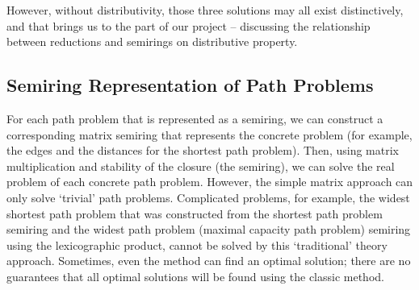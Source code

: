 \documentclass[a4paper,12pt,twoside,openright]{report}
\begin{document}
However, without distributivity, those three solutions may all exist distinctively,  and that brings us to the part of our project – discussing the relationship between reductions and semirings on distributive property.

\subsection{Semiring Representation of Path Problems}
For each path problem that is represented as a semiring, we can construct a corresponding matrix semiring that represents the concrete problem (for example, the edges and the distances for the shortest path problem). Then, using matrix multiplication and stability of the closure (the semiring), we can solve the real problem of each concrete path problem. However, the simple matrix approach can only solve ‘trivial’ path problems. Complicated problems, for example, the widest shortest path problem that was constructed from the shortest path problem semiring and the widest path problem (maximal capacity path problem) semiring using the lexicographic product, cannot be solved by this ‘traditional’ theory approach. Sometimes, even the method can find an optimal solution; there are no guarantees that all optimal solutions will be found using the classic method.
\end{document}
